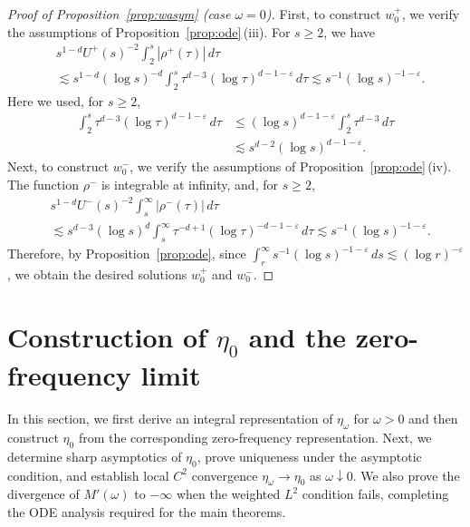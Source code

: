 \documentclass[12pt, a4paper, reqno]{amsart}
\numberwithin{equation}{section}
\theoremstyle{definition}
\theoremstyle{remark}
\begin{document}
\begin{proof}[Proof of Proposition~\ref{prop:wasym} \textup{(}case $\omega=0$\textup{)}]
First, to construct $w_0^+$, we verify the assumptions of
Proposition~\ref{prop:ode}\,\textup{(iii)}. For $s\ge2$, we have
\begin{align*}
   &s^{1-d}U^+(s)^{-2}\int_2^s |\rho^+(\tau)|\,d\tau
\\ &\lesssim s^{1-d}(\log s)^{-d}
    \int_2^s \tau^{d-3}(\log \tau)^{d-1-\varepsilon}\,d\tau
    \lesssim s^{-1}(\log s)^{-1-\varepsilon}.
\end{align*}
Here we used, for $s\ge2$,
\begin{align*}
    \int_2^s \tau^{d-3}(\log \tau)^{d-1-\varepsilon}\,d\tau
    &\le (\log s)^{d-1-\varepsilon}\int_2^s \tau^{d-3}\,d\tau
\\  &\lesssim s^{d-2}(\log s)^{d-1-\varepsilon}.
\end{align*}
Next, to construct $w_0^-$, we verify the assumptions of Proposition~\ref{prop:ode}\,\textup{(iv)}. The function $\rho^-$ is integrable at infinity, and, for $s\ge2$,
\begin{align*}
   &s^{1-d}U^-(s)^{-2}\int_s^\infty |\rho^-(\tau)|\,d\tau
\\ &\lesssim s^{d-3}(\log s)^d\int_s^\infty \tau^{-d+1}(\log \tau)^{-d-1-\varepsilon}\,d\tau
    \lesssim s^{-1}(\log s)^{-1-\varepsilon}.
\end{align*}
Therefore, by Proposition~\ref{prop:ode}, since $\int_r^\infty s^{-1}(\log s)^{-1-\varepsilon}\,ds\lesssim (\log r)^{-\varepsilon}$, we obtain the desired solutions $w_0^+$ and $w_0^-$.
\end{proof}


\section{Construction of \texorpdfstring{$\eta_0$}{eta0} and the zero-frequency limit}
\label{sec:4}

In this section, we first derive an integral representation
of $\eta_\omega$ for $\omega>0$ and then construct $\eta_0$ from the corresponding zero-frequency representation.
Next, we determine sharp asymptotics of $\eta_0$,
prove uniqueness under the asymptotic condition, and establish local
$C^2$ convergence $\eta_\omega\to\eta_0$ as $\omega\downarrow0$. We also prove the divergence
of $M'(\omega)$ to $-\infty$ when the weighted $L^2$ condition fails,
completing the ODE analysis required for the main theorems.
\end{document}
